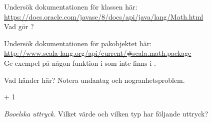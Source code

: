 {{{{\Subtask Undersök dokumentationen för klassen  här: \\ \url{https://docs.oracle.com/javase/8/docs/api/java/lang/Math.html} \\
Vad gör ?

\Subtask Undersök dokumentationen för pakobjektet  här: \\
\url{http://www.scala-lang.org/api/current/#scala.math.package} \\
Ge exempel på någon funktion i  som inte finns i .


\Task Vad händer här? Notera undantag  och nogranhetsproblem. 

\Subtask {} + 1

\Subtask {}

\Subtask {}

\Subtask {}

\Subtask {}

\Subtask {}

\Subtask {}

\Subtask {}

\Subtask {}

\Subtask {}


\Task \textit{Booelska uttryck}. Vilket värde och vilken typ har följande uttryck?

\Subtask {}

\Subtask {}

\Subtask {}

\Subtask {}

\Subtask {}

\Subtask {}

\Subtask {}

\Subtask {}

\Subtask {}

\Subtask {}

\Subtask {}

\Subtask {}

\Subtask {}

}}}}
